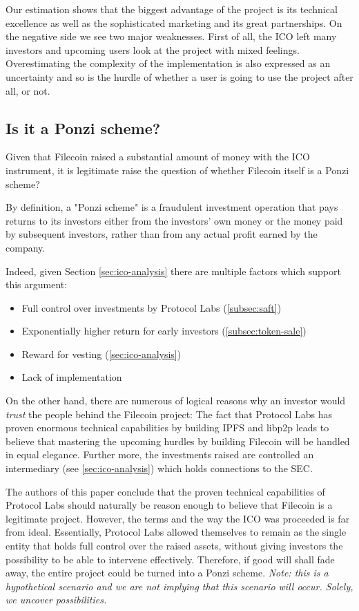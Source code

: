 \documentclass[conference]{IEEEtran}
\begin{document}
Our estimation shows that the biggest advantage of the project is its technical excellence as well as the sophisticated marketing and its great partnerships.
On the negative side we see two major weaknesses.
First of all, the ICO left many investors and upcoming users look at the project with mixed feelings.
Overestimating the complexity of the implementation is also expressed as an uncertainty and so is the hurdle of whether a user is going to use the project after all, or not.

\subsection{Is it a Ponzi scheme?}
Given that Filecoin raised a substantial amount of money with the ICO instrument, it is legitimate raise the question of whether Filecoin itself is a Ponzi scheme?

By definition, a "Ponzi scheme" is a fraudulent investment operation that pays returns to its investors either from the investors’ own money or the money paid by subsequent investors, rather than from any actual profit earned by the company. \cite{ponzi}

Indeed, given Section
\ref{sec:ico-analysis} there are multiple factors which support this argument:
\begin{itemize}
\item Full control over investments by Protocol Labs (\ref{subsec:saft})
\item Exponentially higher return for early investors (\ref{subsec:token-sale})
\item Reward for vesting (\ref{sec:ico-analysis})
\item Lack of implementation
\end{itemize}

On the other hand, there are numerous of logical reasons why an investor would \textit{trust} the people behind the Filecoin project:
The fact that Protocol Labs has proven enormous technical capabilities by building IPFS and libp2p leads to believe that mastering the upcoming hurdles by building Filecoin will be handled in equal elegance.
Further more, the investments raised are controlled an intermediary (see \ref{sec:ico-analysis}) which holds connections to the SEC. 

The authors of this paper conclude that the proven technical capabilities of Protocol Labs should naturally be reason enough to believe that Filecoin is a legitimate project.
However, the terms and the way the ICO was proceeded is far from ideal.
Essentially, Protocol Labs allowed themselves to remain as the single entity that holds full control over the raised assets, without giving investors the possibility to be able to intervene effectively.
Therefore, if good will shall fade away, the entire project could be turned into a Ponzi scheme.
\textit{Note: this is a hypothetical scenario and we are not implying that this scenario will occur. Solely, we uncover possibilities.}
\end{document}
